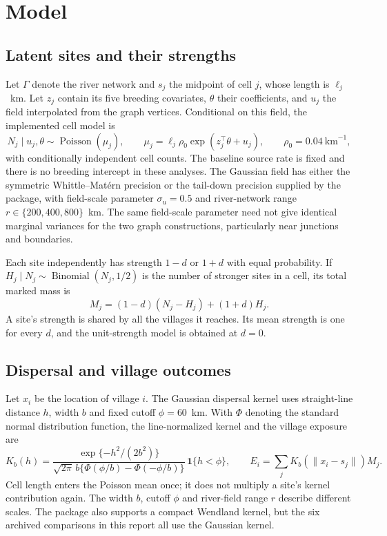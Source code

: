 \documentclass[11pt,a4paper]{article}
\begin{document}
\section{Model}\label{sec:model}

\subsection{Latent sites and their strengths}

Let $\Gamma$ denote the river network and $s_j$ the midpoint of cell $j$, whose length is $\ell_j$~km. Let $z_j$ contain its five breeding covariates, $\theta$ their coefficients, and $u_j$ the field interpolated from the graph vertices. Conditional on this field, the implemented cell model is
\[
 N_j\mid u_j,\theta\sim\operatorname{Poisson}(\mu_j),\qquad
 \mu_j=\ell_j\rho_0\exp(z_j^\top\theta+u_j),\qquad \rho_0=0.04\ \mathrm{km}^{-1},
\]
with conditionally independent cell counts. The baseline source rate is fixed and there is no breeding intercept in these analyses. The Gaussian field has either the symmetric Whittle--Mat\'ern precision or the tail-down precision supplied by the package, with field-scale parameter $\sigma_u=0.5$ and river-network range $r\in\{200,400,800\}$~km. The same field-scale parameter need not give identical marginal variances for the two graph constructions, particularly near junctions and boundaries.

Each site independently has strength $1-d$ or $1+d$ with equal probability. If $H_j\mid N_j\sim\operatorname{Binomial}(N_j,1/2)$ is the number of stronger sites in a cell, its total marked mass is
\[
 M_j=(1-d)(N_j-H_j)+(1+d)H_j.
\]
A site's strength is shared by all the villages it reaches. Its mean strength is one for every $d$, and the unit-strength model is obtained at $d=0$.

\subsection{Dispersal and village outcomes}

Let $x_i$ be the location of village $i$. The Gaussian dispersal kernel uses straight-line distance $h$, width $b$ and fixed cutoff $\phi=60$~km. With $\Phi$ denoting the standard normal distribution function, the line-normalized kernel and the village exposure are
\[
 K_b(h)=\frac{\exp\{-h^2/(2b^2)\}}
 {\sqrt{2\pi}\,b\{\Phi(\phi/b)-\Phi(-\phi/b)\}}\,\mathbf{1}\{h<\phi\},
 \qquad E_i=\sum_j K_b(\|x_i-s_j\|)M_j.
\]
Cell length enters the Poisson mean once; it does not multiply a site's kernel contribution again. The width $b$, cutoff $\phi$ and river-field range $r$ describe different scales. The package also supports a compact Wendland kernel, but the six archived comparisons in this report all use the Gaussian kernel.
\end{document}
